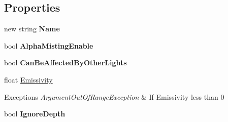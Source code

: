 \subsection*{Properties}
\begin{DoxyCompactItemize}
\item 
\hypertarget{class_s_e_mod_a_p_i_1_1_a_p_i_1_1_definitions_1_1_transparent_materials_definition_a5fd741929eca681f7751c337e6deffc5}{}new string {\bfseries Name}\label{class_s_e_mod_a_p_i_1_1_a_p_i_1_1_definitions_1_1_transparent_materials_definition_a5fd741929eca681f7751c337e6deffc5}

\item 
\hypertarget{class_s_e_mod_a_p_i_1_1_a_p_i_1_1_definitions_1_1_transparent_materials_definition_aa42e6d7dafd2de578a4e75cfe8a16e6a}{}bool {\bfseries Alpha\+Misting\+Enable}\label{class_s_e_mod_a_p_i_1_1_a_p_i_1_1_definitions_1_1_transparent_materials_definition_aa42e6d7dafd2de578a4e75cfe8a16e6a}

\item 
\hypertarget{class_s_e_mod_a_p_i_1_1_a_p_i_1_1_definitions_1_1_transparent_materials_definition_ae0a2bab098384a81fd540eaea9b34e51}{}bool {\bfseries Can\+Be\+Affected\+By\+Other\+Lights}\label{class_s_e_mod_a_p_i_1_1_a_p_i_1_1_definitions_1_1_transparent_materials_definition_ae0a2bab098384a81fd540eaea9b34e51}

\item 
\hypertarget{class_s_e_mod_a_p_i_1_1_a_p_i_1_1_definitions_1_1_transparent_materials_definition_a195eb6efa59c91e45aa13baabc0c2f6e}{}float \hyperlink{class_s_e_mod_a_p_i_1_1_a_p_i_1_1_definitions_1_1_transparent_materials_definition_a195eb6efa59c91e45aa13baabc0c2f6e}{Emissivity}\label{class_s_e_mod_a_p_i_1_1_a_p_i_1_1_definitions_1_1_transparent_materials_definition_a195eb6efa59c91e45aa13baabc0c2f6e}

\begin{DoxyCompactList}\small\item\em 
\begin{DoxyExceptions}{Exceptions}
{\em Argument\+Out\+Of\+Range\+Exception} & If Emissivity less than 0\\
\hline
\end{DoxyExceptions}
\end{DoxyCompactList}\item 
\hypertarget{class_s_e_mod_a_p_i_1_1_a_p_i_1_1_definitions_1_1_transparent_materials_definition_a3d73a8a8a0738dd779c961dfa5b4bc50}{}bool {\bfseries Ignore\+Depth}\label{class_s_e_mod_a_p_i_1_1_a_p_i_1_1_definitions_1_1_transparent_materials_definition_a3d73a8a8a0738dd779c961dfa5b4bc50}


\end{DoxyCompactItemize}
